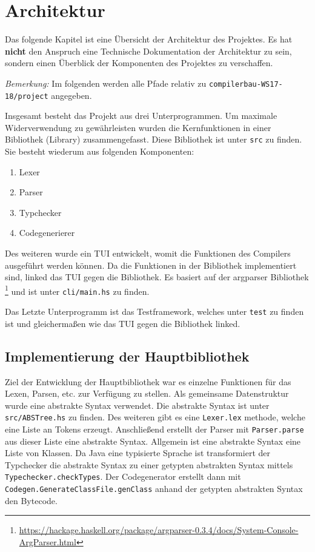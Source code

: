 \chapter{Architektur}
Das folgende Kapitel ist eine Übersicht der Architektur des Projektes.
Es hat \textbf{nicht} den Anspruch eine Technische Dokumentation der Architektur zu sein,
sondern einen Überblick der Komponenten des Projektes zu verschaffen.

\textit{Bemerkung: } Im folgenden werden alle Pfade relativ zu \verb+compilerbau-WS17-18/project+
angegeben.

Insgesamt besteht das Projekt aus drei Unterprogrammen.
Um maximale Widerverwendung zu gewährleisten wurden die Kernfunktionen
in einer Bibliothek (Library) zusammengefasst.
Diese Bibliothek ist unter \verb+src+ zu finden.
Sie besteht wiederum aus folgenden Komponenten:

\begin{enumerate}
	\item Lexer
	\item Parser
	\item Typchecker
	\item Codegenerierer
\end{enumerate}

Des weiteren wurde ein \ac{TUI} entwickelt, womit die Funktionen
des Compilers ausgeführt werden können.
Da die Funktionen in der Bibliothek implementiert sind,
linked das \ac{TUI} gegen die Bibliothek.
Es basiert auf der argparser Bibliothek \footnote{\url{https://hackage.haskell.org/package/argparser-0.3.4/docs/System-Console-ArgParser.html}} und ist unter \verb+cli/main.hs+ zu finden.

Das Letzte Unterprogramm ist das Testframework, welches
unter \verb+test+ zu finden ist und gleichermaßen wie das \ac{TUI} gegen
die Bibliothek linked.

\section{Implementierung der Hauptbibliothek}

Ziel der Entwicklung der Hauptbibliothek war es
einzelne Funktionen für das Lexen, Parsen, etc. zur Verfügung zu stellen.
Als gemeinsame Datenstruktur wurde eine abstrakte Syntax verwendet.
Die abstrakte Syntax ist unter \verb+src/ABSTree.hs+ zu finden.
Des weiteren gibt es eine \lstinline{Lexer.lex} methode, welche eine Liste an Tokens erzeugt.
Anschließend erstellt der Parser mit \lstinline{Parser.parse} aus dieser
Liste eine abstrakte Syntax.
Allgemein ist eine abstrakte Syntax eine Liste von Klassen.
Da Java eine typisierte Sprache ist transformiert der Typchecker die
abstrakte Syntax zu einer getypten abstrakten Syntax mittels \lstinline{Typechecker.checkTypes}.
Der Codegenerator erstellt dann mit \lstinline{Codegen.GenerateClassFile.genClass} anhand der getypten abstrakten Syntax den Bytecode.

